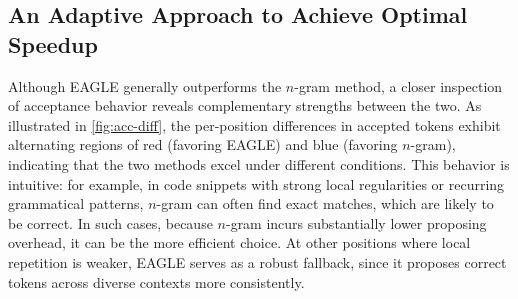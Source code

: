 \documentclass{article}
\newcommand{\jerry}[1]{\textcolor{cyan}{Jerry: #1}}
\begin{document}


\subsection{An Adaptive Approach to Achieve Optimal Speedup}
Although EAGLE generally outperforms the $n$-gram method, 
a closer inspection of acceptance behavior reveals complementary strengths between the two. 
As illustrated in \autoref{fig:acc-diff}, the per-position differences in accepted tokens exhibit alternating regions of red (favoring EAGLE) and blue (favoring $n$-gram), indicating that the two methods excel under different conditions. This behavior is intuitive: for example, in code snippets with strong local regularities or recurring grammatical patterns, $n$-gram can often find exact matches, which are likely to be correct.
In such cases, because $n$-gram incurs substantially lower proposing overhead, it can be the more efficient choice. At other positions where local repetition is weaker, EAGLE serves as a robust fallback, since it proposes correct tokens across diverse contexts more consistently.
\end{document}
